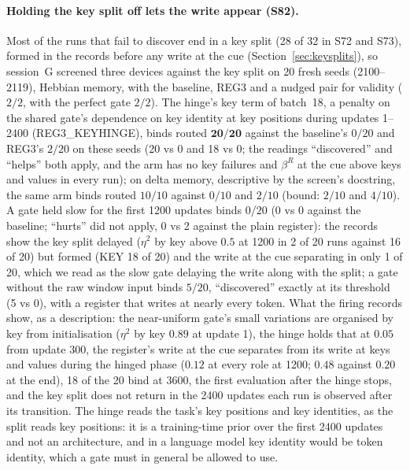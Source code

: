 \documentclass[11pt]{article}
\begin{document}
\paragraph{Holding the key split off lets the write appear (S82).} Most of the runs that fail to discover end in a key split (28 of 32 in S72 and S73), formed in the records before any write at the cue (Section~\ref{sec:keysplits}), so session~G screened three devices against the key split on 20 fresh seeds (2100--2119), Hebbian memory, with the baseline, REG3 and a nudged pair for validity ($2/2$, with the perfect gate $2/2$). The hinge's key term of batch~18, a penalty on the shared gate's dependence on key identity at key positions during updates 1--2400 (REG3\_KEYHINGE), binds routed $\mathbf{20/20}$ against the baseline's $0/20$ and REG3's $2/20$ on these seeds (20 vs 0 and 18 vs 0; the readings ``discovered'' and ``helps'' both apply, and the arm has no key failures and $\beta^R$ at the cue above keys and values in every run); on delta memory, descriptive by the screen's docstring, the same arm binds routed $10/10$ against $0/10$ and $2/10$ (bound: $2/10$ and $4/10$). A gate held slow for the first 1200 updates binds $0/20$ (0 vs 0 against the baseline; ``hurts'' did not apply, 0 vs 2 against the plain register): the records show the key split delayed ($\eta^2$ by key above $0.5$ at 1200 in 2 of 20 runs against 16 of 20) but formed (KEY 18 of 20) and the write at the cue separating in only 1 of 20, which we read as the slow gate delaying the write along with the split; a gate without the raw window input binds $5/20$, ``discovered'' exactly at its threshold (5 vs 0), with a register that writes at nearly every token. What the firing records show, as a description: the near-uniform gate's small variations are organised by key from initialisation ($\eta^2$ by key $0.89$ at update 1), the hinge holds that at $0.05$ from update 300, the register's write at the cue separates from its write at keys and values during the hinged phase ($0.12$ at every role at 1200; $0.48$ against $0.20$ at the end), 18 of the 20 bind at 3600, the first evaluation after the hinge stops, and the key split does not return in the 2400 updates each run is observed after its transition. The hinge reads the task's key positions and key identities, as the split reads key positions: it is a training-time prior over the first 2400 updates and not an architecture, and in a language model key identity would be token identity, which a gate must in general be allowed to use.
\end{document}

